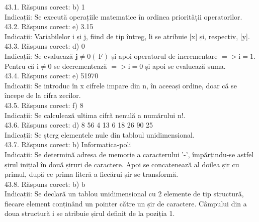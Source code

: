 43.1. Răspuns corect: b) 1\\
Indicații: Se execută operațiile matematice în ordinea priorității operatorilor.\\

43.2. Răspuns corect: e) 3.15\\
Indicații: Variabilelor i și j, fiind de tip întreg, li se atribuie [x] și, respectiv, [y].\\

43.3. Răspuns corect: d) 0\\
Indicații: Se evaluează $\mathbf{j} \neq 0(\mathrm{~F})$ și apoi operatorul de incrementare $=>\mathrm{i}=1$. Pentru că $\mathrm{i} \neq 0$ se decrementează $=>\mathrm{i}=0$ și apoi se evaluează suma.\\

43.4. Răspuns corect: e) 51970\\
Indicații: Se introduc în x cifrele impare din n, în aceeași ordine, doar că se începe de la cifra zecilor.\\

43.5. Răspuns corect: f) 8\\
Indicații: Se calculează ultima cifră nenulă a numărului n!.\\

43.6. Răspuns corect: d) 8 56 4 13 6 18 26 90 25\\
Indicații: Se șterg elementele nule din tabloul unidimensional.\\

43.7. Răspuns corect: b) Informatica-poli\\
Indicații: Se determină adresa de memorie a caracterului '-', împărțindu-se astfel șirul inițial în două șiruri de caractere. Apoi se concatenează al doilea șir cu primul, după ce prima literă a fiecărui șir se transformă.\\

43.8. Răspuns corect: b) b\\
Indicații: Se declară un tablou unidimensional cu 2 elemente de tip structură, fiecare element conținând un pointer către un șir de caractere. Câmpului din a doua structură i se atribuie șirul definit de la poziția 1.\\

